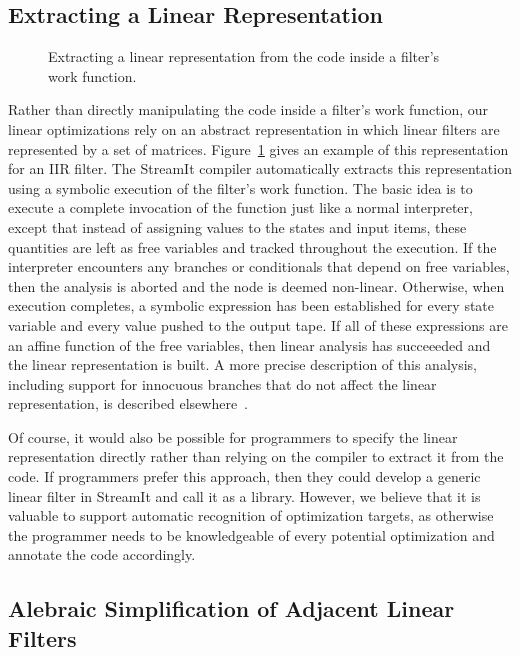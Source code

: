 \subsection*{Extracting a Linear Representation}

\begin{figure}[t]
\caption[Extracting a linear representation]{Extracting a linear
  representation from the code inside a filter's work
  function.\protect\label{fig:extraction}}
\end{figure}

Rather than directly manipulating the code inside a filter's work
function, our linear optimizations rely on an abstract representation
in which linear filters are represented by a set of matrices.
Figure~\ref{fig:extraction} gives an example of this representation
for an IIR filter.  The StreamIt compiler automatically extracts this
representation using a symbolic execution of the filter's work
function.  The basic idea is to execute a complete invocation of the
function just like a normal interpreter, except that instead of
assigning values to the states and input items, these quantities are
left as free variables and tracked throughout the execution.  If the
interpreter encounters any branches or conditionals that depend on
free variables, then the analysis is aborted and the node is deemed
non-linear.  Otherwise, when execution completes, a symbolic
expression has been established for every state variable and every
value pushed to the output tape.  If all of these expressions are an
affine function of the free variables, then linear analysis has
succeeeded and the linear representation is built.  A more precise
description of this analysis, including support for innocuous branches
that do not affect the linear representation, is described
elsewhere~\cite{streamit-linear}.

Of course, it would also be possible for programmers to specify the
linear representation directly rather than relying on the compiler to
extract it from the code.  If programmers prefer this approach, then
they could develop a generic linear filter in StreamIt and call it as
a library.  However, we believe that it is valuable to support
automatic recognition of optimization targets, as otherwise the
programmer needs to be knowledgeable of every potential optimization
and annotate the code accordingly.

\subsection*{Alebraic Simplification of Adjacent Linear Filters}

